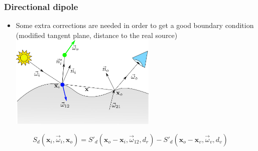 \documentclass{beamer}
\newcommand{\vomega}{\vec{\omega}}
\newcommand{\x}{\mathbf{x}}
\begin{document}
\begin{frame}
    \frametitle{Directional dipole}
		\vspace{0.3cm}
			\begin{itemize}
				\item Some extra corrections are needed in order to get a good boundary condition \\(modified tangent plane, distance to the real source)	\\			
				\centering
				\vspace{0.2cm}
				\includegraphics[width=0.55\textwidth]{jeppe}
			\end{itemize}
			$$
			S_d(\x_i, \vomega_i, \x_o) = S'_d(\x_o - \x_i, \vomega_{12}, d_r) - S'_d(\x_o - \x_v, \vomega_{v}, d_v)
			$$

\end{frame}
\end{document}
